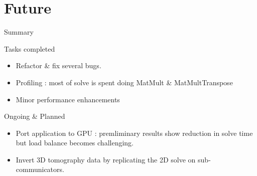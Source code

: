 \documentclass[aspectratio=43]{beamer}
\begin{document}
\section{Future}
\begin{frame}{Summary}
  \begin{block}{Tasks completed}
  \begin{itemize}
  \item Refactor \& fix several bugs.
  \item Profiling : most of solve is spent doing MatMult \& MatMultTranspose
  \item Minor performance enhancements
  \end{itemize}
  \end{block}
  \begin{exampleblock}{Ongoing \& Planned}
  \begin{itemize}
  \item Port application to GPU : premliminary results show reduction in solve time but load balance becomes challenging.
  \item Invert 3D tomography data by replicating the 2D solve on sub-communicators.
  \end{itemize}	
  \end{exampleblock}
	
\end{frame}
\end{document}
